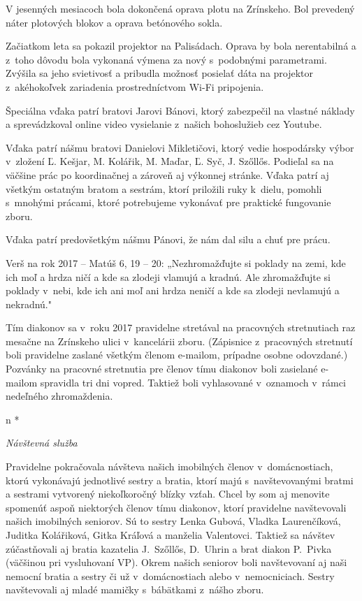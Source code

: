 V jesenných mesiacoch bola dokončená oprava plotu na Zrínskeho. Bol prevedený náter plotových blokov a oprava betónového sokla.

Začiatkom leta sa pokazil projektor na Palisádach. Oprava by bola nerentabilná a z~toho dôvodu bola vykonaná výmena za nový s~podobnými parametrami. Zvýšila sa jeho svietivosť a pribudla možnosť posielať dáta na projektor z~akéhokoľvek zariadenia prostredníctvom Wi-Fi pripojenia.

Špeciálna vďaka patrí bratovi Jarovi Bánovi, ktorý zabezpečil na vlastné náklady a sprevádzkoval online video vysielanie z~našich bohoslužieb cez Youtube.

Vďaka patrí nášmu bratovi Danielovi Mikletičovi, ktorý vedie hospodársky výbor v~zložení Ľ. Kešjar, M. Kolářik, M. Maďar,  Ľ. Syč, J. Szőllős. Podieľal sa na väčšine prác po koordinačnej a zároveň aj výkonnej stránke. Vďaka patrí aj všetkým ostatným bratom a sestrám, ktorí priložili ruky k~dielu, pomohli s~mnohými prácami, ktoré potrebujeme vykonávať pre praktické fungovanie zboru.

Vďaka patrí predovšetkým nášmu Pánovi, že nám dal silu a chuť pre prácu.


Verš na rok 2017 -- Matúš 6, 19 -- 20: „Nezhromažďujte si poklady na zemi, kde ich moľ a hrdza ničí a kde sa zlodeji vlamujú a kradnú. Ale zhromažďujte si poklady v~nebi, kde ich ani moľ ani hrdza neničí a kde sa zlodeji nevlamujú a nekradnú."


Tím diakonov sa v~roku 2017 pravidelne stretával na pracovných stretnutiach raz mesačne na Zrínskeho ulici v~kancelárii zboru. (Zápisnice z~pracovných stretnutí boli pravidelne zaslané všetkým členom e-mailom, prípadne osobne odovzdané.) Pozvánky na pracovné stretnutia pre členov tímu diakonov boli zasielané e-mailom spravidla tri dni vopred. Taktiež boli vyhlasované v~oznamoch v~rámci  nedeľného  zhromaždenia.

\def\aktivita#1{{\it #1\par}\firstnoindent}

\begitems \style n
* \aktivita{Návštevná služba}
Pravidelne pokračovala návšteva našich imobilných členov v~domácnostiach, ktorú vykonávajú jednotlivé sestry a bratia, ktorí majú s~navštevovanými bratmi a sestrami vytvorený niekoľkoročný blízky vzťah.  Chcel by som aj menovite spomenúť aspoň niektorých  členov tímu diakonov, ktorí pravidelne navštevovali našich imobilných seniorov. Sú to sestry Lenka Gubová, Vladka Laurenčíková, Juditka Kolářiková, Gitka Kráľová a manželia Valentovci. Taktiež sa návštev zúčastňovali aj bratia kazatelia J.~Szőllős, D.~Uhrin a brat diakon P.~Pivka (väčšinou pri vysluhovaní VP).
Okrem našich seniorov boli navštevovaní aj naši nemocní bratia a sestry či už v~domácnostiach alebo v~nemocniciach. Sestry navštevovali aj mladé mamičky s~bábätkami z~nášho zboru.


